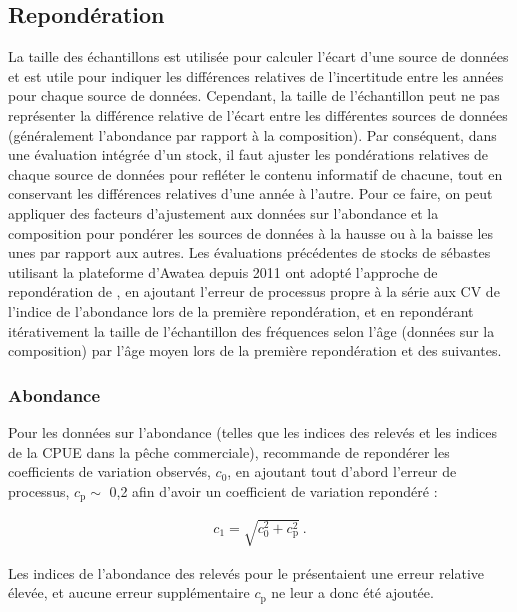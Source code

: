 \documentclass[11pt]{book}
\def\vsd{\vspace*{1ex}}     %
\renewcommand{\eb}{\vsd \vsd \begin{eqnarray}}
\renewcommand{\ee}{\end{eqnarray} \vsd }
\begin{document}
\subsection{Repond\'{e}ration} \label{ss:reweight}

La taille des \'{e}chantillons est utilis\'{e}e pour calculer l'\'{e}cart d'une source de donn\'{e}es et est utile pour indiquer les diff\'{e}rences relatives de l'incertitude entre les ann\'{e}es pour chaque source de donn\'{e}es.
Cependant, la taille de l'\'{e}chantillon peut ne pas repr\'{e}senter la diff\'{e}rence relative de l'\'{e}cart entre les diff\'{e}rentes sources de donn\'{e}es (g\'{e}n\'{e}ralement l'abondance par rapport \`{a} la composition).
Par cons\'{e}quent, dans une \'{e}valuation int\'{e}gr\'{e}e d'un stock, il faut ajuster les pond\'{e}rations relatives de chaque source de donn\'{e}es pour refl\'{e}ter le contenu informatif de chacune, tout en conservant les diff\'{e}rences relatives d'une ann\'{e}e \`{a} l'autre.
Pour ce faire, on peut appliquer des facteurs d'ajustement aux donn\'{e}es sur l'abondance et la composition pour pond\'{e}rer les sources de donn\'{e}es \`{a} la hausse ou \`{a} la baisse les unes par rapport aux autres.
Les \'{e}valuations pr\'{e}c\'{e}dentes de stocks de s\'{e}bastes utilisant la plateforme d'Awatea depuis 2011 ont adopt\'{e} l'approche de repond\'{e}ration de \citet{Francis:2011}, en ajoutant l'erreur de processus propre \`{a} la s\'{e}rie aux CV de l'indice de l'abondance lors de la premi\`{e}re repond\'{e}ration, et en repond\'{e}rant it\'{e}rativement la taille de l'\'{e}chantillon des fr\'{e}quences selon l'\^{a}ge (donn\'{e}es sur la composition) par l'\^{a}ge moyen lors de la premi\`{e}re repond\'{e}ration et des suivantes.

\subsubsection{Abondance} \label{sss:rwt_abund}


Pour les donn\'{e}es sur l'abondance (telles que les indices des relev\'{e}s et les indices de la CPUE dans la p\^{e}che commerciale), \citet{Francis:2011} recommande de repond\'{e}rer les coefficients de variation observ\'{e}s, $c_0$, en ajoutant tout d'abord l'erreur de processus, $c_\text{p} \sim$ 0,2 afin d'avoir un coefficient de variation repond\'{e}r\'{e} :

\eb
c_1 = \sqrt{c_0^2 + c_\text{p}^2}~. \label{reweight}
\ee

Les indices de l'abondance des relev\'{e}s pour le \spc{} pr\'{e}sentaient une erreur relative \'{e}lev\'{e}e, et aucune erreur suppl\'{e}mentaire $c_\text{p}$ ne leur a donc \'{e}t\'{e} ajout\'{e}e.
\end{document}
